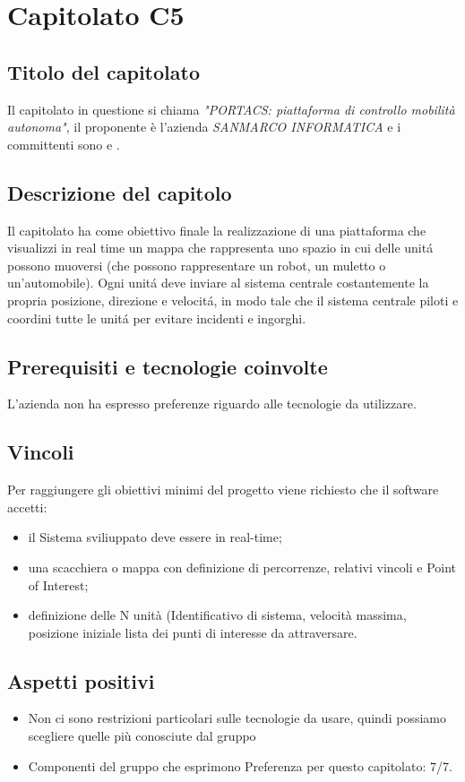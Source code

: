 \section{Capitolato C5}
\subsection{Titolo del capitolato}
Il capitolato in questione si chiama \textit{"PORTACS: piattaforma di controllo mobilità autonoma"}, il proponente \`e l'azienda \textit{SANMARCO INFORMATICA} e i committenti sono \VT{} e \CR{}.

\subsection{Descrizione del capitolo}
Il capitolato ha come obiettivo finale la realizzazione di una piattaforma che visualizzi in real time un mappa che rappresenta uno spazio in cui delle unit\'a possono muoversi (che possono rappresentare un robot, un muletto o un’automobile). Ogni unit\'a deve inviare al sistema centrale costantemente la propria posizione, direzione e velocit\'a, in modo tale che il sistema centrale piloti e coordini tutte le unit\'a per evitare incidenti e ingorghi. 

\subsection{Prerequisiti e tecnologie coinvolte}
L'azienda non ha espresso preferenze riguardo alle tecnologie da utilizzare.

\subsection{Vincoli}
Per raggiungere gli obiettivi minimi del progetto viene richiesto che il software accetti:

\begin{itemize}
\item il Sistema sviliuppato deve essere in real-time;
\item una scacchiera o mappa con definizione di percorrenze, relativi vincoli e Point of Interest;
\item definizione delle N unità (Identificativo di sistema, velocità massima, posizione iniziale lista dei punti di interesse da attraversare.
\end{itemize}

\subsection{Aspetti positivi}
\begin{itemize}
\item Non ci sono restrizioni particolari sulle tecnologie da usare, quindi possiamo scegliere quelle più conosciute dal gruppo
\item Componenti del gruppo che esprimono Preferenza per questo capitolato: 7/7.
\end{itemize}

